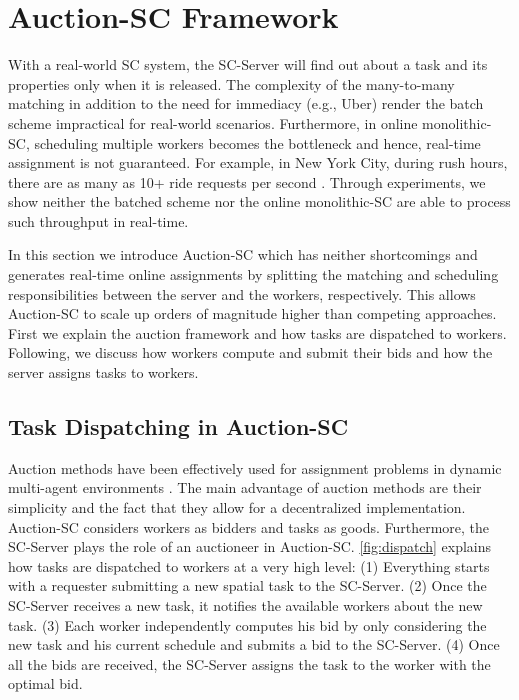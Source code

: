 \vspace{-0.06in}
\section{Auction-SC Framework}
\label{sec:onlinealgo}
\vspace{-0.1in}
With a real-world SC system, the SC-Server will find out about a task and its properties only when it is released. The complexity of the many-to-many matching in addition to the need for immediacy (e.g., Uber) render the batch scheme impractical for real-world scenarios. Furthermore, in online monolithic-SC, scheduling multiple workers becomes the bottleneck and hence, real-time assignment is not guaranteed. For example, in New York City, during rush hours, there are as many as 10+ ride requests per second \cite{NYCTaxi}. Through experiments, we show neither the batched scheme nor the online monolithic-SC are able to process such throughput in real-time.

In this section we introduce Auction-SC which has neither shortcomings and generates real-time online assignments by splitting the matching and scheduling responsibilities between the server and the workers, respectively. This allows Auction-SC to scale up orders of magnitude higher than competing approaches. First we explain the auction framework and how tasks are dispatched to workers. Following, we discuss how workers compute and submit their bids and how the server assigns tasks to workers.
\vspace{-0.05in}
\subsection{Task Dispatching in Auction-SC}
\vspace{-0.05in}
Auction methods have been effectively used for assignment problems in dynamic multi-agent environments \cite{Mehta05}. The main advantage of auction methods are their simplicity and the fact that they allow for a decentralized implementation. Auction-SC considers workers as bidders and tasks as goods. Furthermore, the SC-Server plays the role of an auctioneer in Auction-SC. \cref{fig:dispatch} explains how tasks are dispatched to workers at a very high level: (1) Everything starts with a requester submitting a new spatial task to the SC-Server. (2) Once the SC-Server receives a new task, it notifies the available workers about the new task. (3) Each worker independently computes his bid by only considering the new task and his current schedule and submits a bid to the SC-Server. (4) Once all the bids are received, the SC-Server assigns the task to the worker with the optimal bid.


